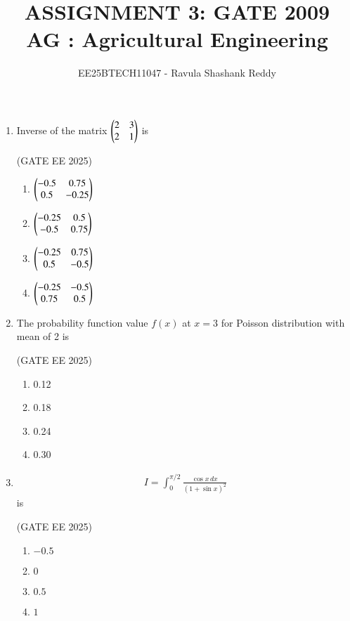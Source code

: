 \documentclass[journal,12pt,onecolumn]{IEEEtran}
\theoremstyle{remark}
\begin{document}
\title{
ASSIGNMENT 3: GATE 2009 \\
AG : Agricultural Engineering}
\author{EE25BTECH11047 - Ravula Shashank Reddy}
\maketitle
\renewcommand{\thefigure}{\theenumi}
\renewcommand{\thetable}{\theenumi}
\begin{enumerate}

\item Inverse of the matrix $\begin{pmatrix}2 & 3 \\ 2 & 1 \end{pmatrix}$ is

\hfill(GATE EE 2025)

\begin{multicols}{2}
\begin{enumerate}
\item $\begin{pmatrix}-0.5 & 0.75 \\ 0.5 & -0.25\end{pmatrix} $
\item $\begin{pmatrix}-0.25 & 0.5 \\ -0.5 & 0.75\end{pmatrix}$
\item $\begin{pmatrix}-0.25 & 0.75 \\ 0.5 & -0.5\end{pmatrix}$
\item $\begin{pmatrix}-0.25 & -0.5 \\ 0.75 & 0.5\end{pmatrix}$
\end{enumerate}
\end{multicols}

\item The probability function value $f(x)$ at $x=3$ for Poisson distribution with mean of 2 is 

\hfill(GATE EE 2025)

\begin{multicols}{4}
\begin{enumerate}
\item 0.12  
\item 0.18  
\item 0.24  
\item 0.30  
\end{enumerate}
\end{multicols}

\item \begin{align*}
   I=\int_{0}^{\pi/2} \frac{\cos x \, dx}{(1+\sin x)^2}  
\end{align*}is 

\hfill(GATE EE 2025)

\begin{multicols}{4}
\begin{enumerate}
\item $-0.5$  
\item $0$  
\item $0.5$  
\item $1$  
\end{enumerate}
\end{multicols}


\end{enumerate}
\end{document}
